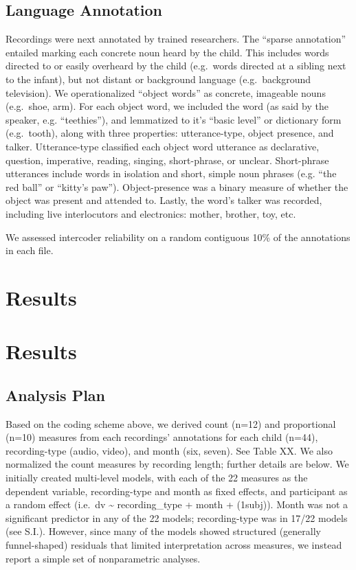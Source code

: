 \documentclass[man]{apa6}
\theoremstyle{definition}
\theoremstyle{definition}
\theoremstyle{definition}
\theoremstyle{remark}
\begin{document}
\subsection{Language Annotation}\label{language-annotation}

Recordings were next annotated by trained researchers. The
\enquote{sparse annotation} entailed marking each concrete noun heard by
the child. This includes words directed to or easily overheard by the
child (e.g.~words directed at a sibling next to the infant), but not
distant or background language (e.g.~background television). We
operationalized \enquote{object words} as concrete, imageable nouns
(e.g.~shoe, arm). For each object word, we included the word (as said by
the speaker, e.g. \enquote{teethies}), and lemmatized to it's
\enquote{basic level} or dictionary form (e.g.~tooth), along with three
properties: utterance-type, object presence, and talker. Utterance-type
classified each object word utterance as declarative, question,
imperative, reading, singing, short-phrase, or unclear. Short-phrase
utterances include words in isolation and short, simple noun phrases
(e.g. \enquote{the red ball} or \enquote{kitty's paw}). Object-presence
was a binary measure of whether the object was present and attended to.
Lastly, the word's talker was recorded, including live interlocutors and
electronics: mother, brother, toy, etc.

We assessed intercoder reliability on a random contiguous 10\% of the
annotations in each file.

\section{Results}\label{results}

\section{Results}\label{results-1}

\subsection{Analysis Plan}\label{analysis-plan}

Based on the coding scheme above, we derived count (n=12) and
proportional (n=10) measures from each recordings' annotations for each
child (n=44), recording-type (audio, video), and month (six, seven). See
Table XX. We also normalized the count measures by recording length;
further details are below. We initially created multi-level models, with
each of the 22 measures as the dependent variable, recording-type and
month as fixed effects, and participant as a random effect (i.e.~dv
\textasciitilde{} recording\_type + month + (1\textbar{}subj)). Month
was not a significant predictor in any of the 22 models; recording-type
was in 17/22 models (see S.I.). However, since many of the models showed
structured (generally funnel-shaped) residuals that limited
interpretation across measures, we instead report a simple set of
nonparametric analyses.
\end{document}

